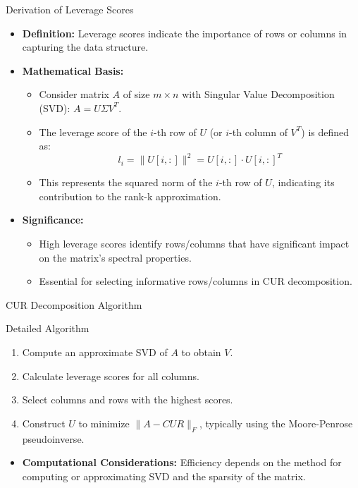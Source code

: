\documentclass[pdf]{beamer}
\begin{document}
\begin{frame}{Derivation of Leverage Scores}
    \begin{itemize}
        \item \textbf{Definition:} Leverage scores indicate the importance of rows or columns in capturing the data structure.
        \item \textbf{Mathematical Basis:}
            \begin{itemize}
                \item Consider matrix \( A \) of size \( m \times n \) with Singular Value Decomposition (SVD): \( A = U \Sigma V^T \).
                \item The leverage score of the \( i \)-th row of \( U \) (or \( i \)-th column of \( V^T \)) is defined as:
                \[
                l_i = \| U[i,:] \|^2 = U[i,:] \cdot U[i,:]^T
                \]
                \item This represents the squared norm of the \( i \)-th row of \( U \), indicating its contribution to the rank-k approximation.
            \end{itemize}
        \item \textbf{Significance:}
            \begin{itemize}
                \item High leverage scores identify rows/columns that have significant impact on the matrix's spectral properties.
                \item Essential for selecting informative rows/columns in CUR decomposition.
            \end{itemize}
    \end{itemize}
\end{frame}


\begin{frame}{CUR Decomposition Algorithm}
    \begin{block}{Detailed Algorithm}
        \begin{enumerate}
            \item Compute an approximate SVD of \( A \) to obtain \( V \).
            \item Calculate leverage scores for all columns.
            \item Select columns and rows with the highest scores.
            \item Construct \( U \) to minimize \( \| A - CUR \|_F \), typically using the Moore-Penrose pseudoinverse.
        \end{enumerate}
    \end{block}
    \begin{itemize}
        \item \textbf{Computational Considerations:} Efficiency depends on the method for computing or approximating SVD and the sparsity of the matrix.
    \end{itemize}
\end{frame}
\end{document}
